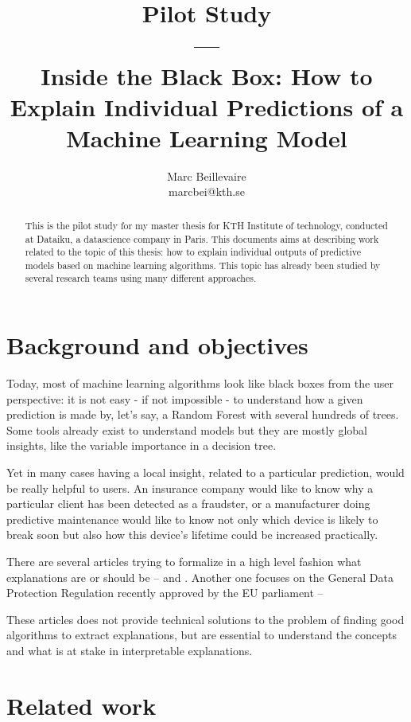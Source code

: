 \documentclass[a4paper]{article}
\title{Pilot Study\\ — \\ Inside the Black Box: How to Explain Individual Predictions of a Machine Learning Model}
\author{Marc Beillevaire \\ marcbei@kth.se}
\begin{document}
\maketitle

\begin{abstract}
This is the pilot study for my master thesis for KTH Institute of technology, conducted at Dataiku, a datascience company in Paris. This documents aims at describing work related to the topic of this thesis: how to explain individual outputs of predictive models based on machine learning algorithms. This topic has already been studied by several research teams using many different approaches.
\end{abstract}

\section{Background and objectives}

Today, most of machine learning algorithms look like black boxes from the user perspective: it is not easy - if not impossible - to understand how a given prediction is made by, let's say, a Random Forest with several hundreds of trees. Some tools already exist to understand models but they are mostly global insights, like the variable importance in a decision tree.

Yet in many cases having a local insight, related to a particular prediction, would be really helpful to users. An insurance company would like to know why a particular client has been detected as a fraudster, or a manufacturer doing predictive maintenance would like to know not only which device is likely to break soon but also how this device's lifetime could be increased practically.

There are several articles trying to formalize in a high level fashion what explanations are or should be -- \cite{trust} and \cite{mythos}. Another one focuses on the General Data Protection Regulation recently approved by the EU parliament -- \cite{euregulation}

These articles does not provide technical solutions to the problem of finding good algorithms to extract explanations, but are essential to understand the concepts and what is at stake in interpretable explanations.

\section{Related work}
\end{document}
